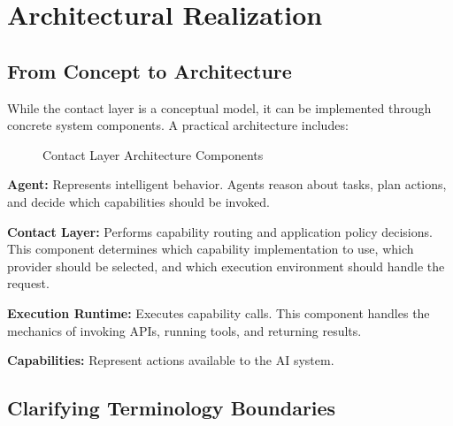 \section{Architectural Realization}

\subsection{From Concept to Architecture}

While the contact layer is a conceptual model, it can be implemented through concrete system components. A practical architecture includes:

\begin{figure}[htbp]
\centering
{}
\caption{Contact Layer Architecture Components}
\end{figure}

\textbf{Agent:} Represents intelligent behavior. Agents reason about tasks, plan actions, and decide which capabilities should be invoked.

\textbf{Contact Layer:} Performs capability routing and application policy decisions. This component determines which capability implementation to use, which provider should be selected, and which execution environment should handle the request.

\textbf{Execution Runtime:} Executes capability calls. This component handles the mechanics of invoking APIs, running tools, and returning results.

\textbf{Capabilities:} Represent actions available to the AI system.

\subsection{Clarifying Terminology Boundaries}

